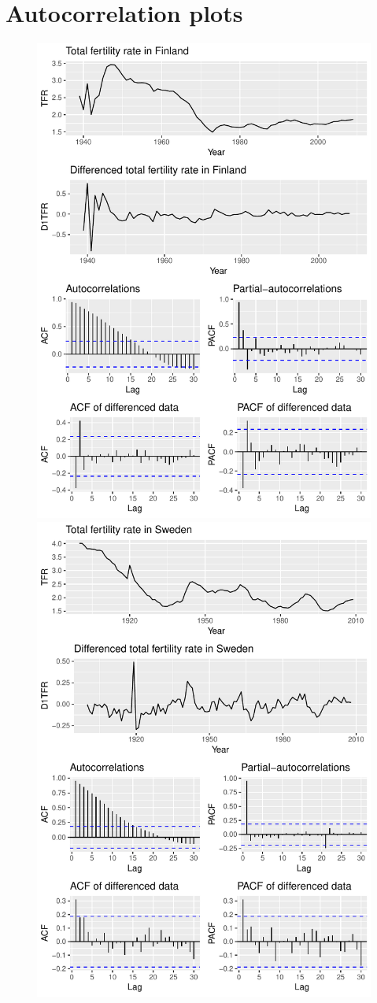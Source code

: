 \documentclass[a4paper, 12pt]{scrartcl}
\begin{document}
\section{Autocorrelation plots}\label{app:autocorrelationplots}
\begin{figure}[h!]
	\centering
	\includegraphics[height=0.85\textwidth, angle=-90]{ACFinland}
	\includegraphics[height=0.85\textwidth, angle=-90]{ACSweden}
\end{figure}
\end{document}
